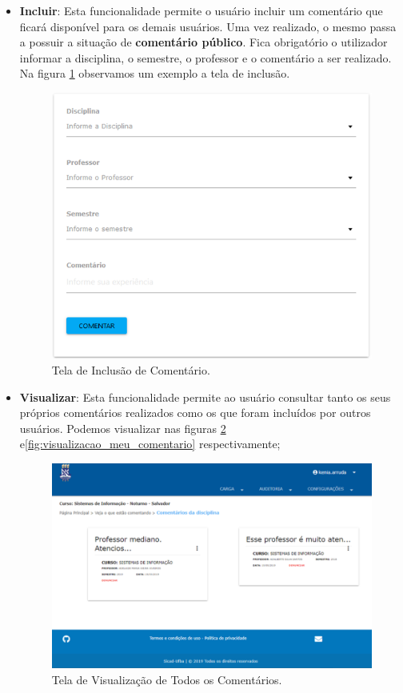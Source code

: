 \documentclass[12pt, a4paper]{report}
\begin{document}
\begin{itemize}
\item \textbf{Incluir}: Esta funcionalidade permite o usuário incluir um comentário que ficará disponível para os demais usuários. Uma vez realizado, o mesmo passa a possuir a situação de \textbf{comentário público}. Fica obrigatório o utilizador informar a disciplina, o semestre, o professor e o comentário a ser realizado. Na figura \ref{fig:incluir_comentario} observamos um exemplo a tela de inclusão.

\begin{figure}
\centering
\includegraphics[scale=0.6]{incluir_comentario.png}
\caption{Tela de Inclusão de Comentário.}
\label{fig:incluir_comentario}
\end{figure}

\item \textbf{Visualizar}: Esta funcionalidade permite ao usuário consultar tanto os seus próprios comentários realizados como os que foram incluídos por outros usuários. Podemos visualizar nas figuras \ref{fig:comentarios} e\ref{fig:visualizacao_meu_comentario} respectivamente; 

\begin{figure}
\centering
\includegraphics[scale=0.5]{comentarios.png}
\caption{Tela de Visualização de Todos os Comentários.}
\label{fig:comentarios}
\end{figure}


\end{itemize}
\end{document}
